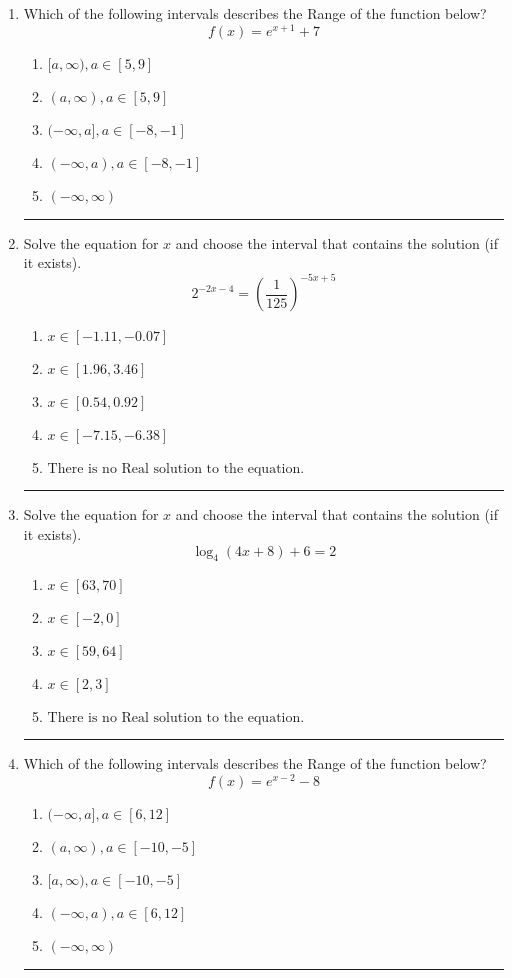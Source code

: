 \documentclass[14pt]{extbook}
\newcommand{\litem}[1]{\item#1\hspace*{-1cm}\rule{\textwidth}{0.4pt}}
\begin{document}
\begin{enumerate}
\litem{
Which of the following intervals describes the Range of the function below?\[ f(x) = e^{x+1}+7 \]\begin{enumerate}[label=\Alph*.]
\item \( [a, \infty), a \in [5, 9] \)
\item \( (a, \infty), a \in [5, 9] \)
\item \( (-\infty, a], a \in [-8, -1] \)
\item \( (-\infty, a), a \in [-8, -1] \)
\item \( (-\infty, \infty) \)

\end{enumerate} }
\litem{
Solve the equation for $x$ and choose the interval that contains the solution (if it exists).\[ 2^{-2x-4} = \left(\frac{1}{125}\right)^{-5x+5} \]\begin{enumerate}[label=\Alph*.]
\item \( x \in [-1.11, -0.07] \)
\item \( x \in [1.96, 3.46] \)
\item \( x \in [0.54, 0.92] \)
\item \( x \in [-7.15, -6.38] \)
\item \( \text{There is no Real solution to the equation.} \)

\end{enumerate} }
\litem{
Solve the equation for $x$ and choose the interval that contains the solution (if it exists).\[ \log_{4}{(4x+8)}+6 = 2 \]\begin{enumerate}[label=\Alph*.]
\item \( x \in [63, 70] \)
\item \( x \in [-2, 0] \)
\item \( x \in [59, 64] \)
\item \( x \in [2, 3] \)
\item \( \text{There is no Real solution to the equation.} \)

\end{enumerate} }
\litem{
Which of the following intervals describes the Range of the function below?\[ f(x) = e^{x-2}-8 \]\begin{enumerate}[label=\Alph*.]
\item \( (-\infty, a], a \in [6, 12] \)
\item \( (a, \infty), a \in [-10, -5] \)
\item \( [a, \infty), a \in [-10, -5] \)
\item \( (-\infty, a), a \in [6, 12] \)
\item \( (-\infty, \infty) \)


\end{enumerate}}
\end{enumerate}
\end{document}
